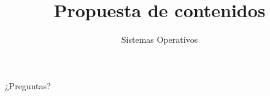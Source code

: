 


\title{Propuesta de contenidos}
\author{Sistemas Operativos}



\begin{frame}
  \titlepage
\end{frame}



\begin{frame}{}
  \begin{center}
    \vfill
    \huge ¿Preguntas?
    \vfill
  \end{center}
\end{frame}


